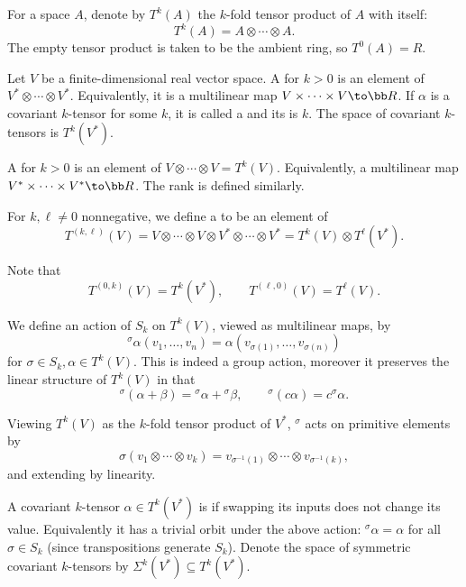 \bdefn

    For a space $A$, denote by $T^k(A)$ the $k$-fold tensor product of $A$ with itself:
    $$ T^k(A) = A\otimes\cdots\otimes A . $$
    The empty tensor product is taken to be the ambient ring, so $T^0(A)=R$.

\edefn

\bdefn

    Let $V$ be a finite-dimensional real vector space.
    A  for $k>0$ is an element of $V^*\otimes\cdots\otimes V^*$.
    Equivalently, it is a multilinear map $V\times\cdots\times V\to\bR$.
    If $\alpha$ is a covariant $k$-tensor for some $k$, it is called a  and its  is $k$.
    The space of covariant $k$-tensors is $T^k(V^*)$.

    A  for $k>0$ is an element of $V\otimes\cdots\otimes V=T^k(V)$.
    Equivalently, a multilinear map $V^*\times\cdots\times V^*\to\bR$.
    The rank is defined similarly.

    For $k,\ell\neq0$ nonnegative, we define a  to be an element of
    $$ T^{(k,\ell)}(V) = V\otimes\cdots\otimes V\otimes V^*\otimes\cdots\otimes V^* = T^k(V) \otimes T^\ell(V^*) . $$

\edefn

Note that
$$ T^{(0,k)}(V) = T^k(V^*),\qquad T^{(\ell,0)}(V) = T^\ell(V) . $$

\bdefn

    We define an action of $S_k$ on $T^k(V)$, viewed as multilinear maps, by
    $$ {}^\sigma\alpha(v_1,\dots,v_n) = \alpha(v_{\sigma(1)},\dots,v_{\sigma(n)}) $$
    for $\sigma\in S_k,\alpha\in T^k(V)$.
    This is indeed a group action, moreover it preserves the linear structure of $T^k(V)$ in that
    $$ {}^\sigma(\alpha+\beta) = {}^\sigma\alpha + {}^\sigma\beta,\qquad {}^\sigma(c\alpha) = c{}^\sigma\alpha . $$

\edefn

Viewing $T^k(V)$ as the $k$-fold tensor product of $V^*$, ${}^\sigma$ acts on primitive elements by
$$ \sigma(v_1\otimes\cdots\otimes v_k) = v_{\sigma^{-1}(1)}\otimes\cdots\otimes v_{\sigma^{-1}(k)} , $$
and extending by linearity.

\bdefn

    A covariant $k$-tensor $\alpha\in T^k(V^*)$ is  if swapping its inputs does not change its value.
    Equivalently it has a trivial orbit under the above action: ${}^\sigma\alpha=\alpha$ for all $\sigma\in S_k$ (since transpositions
    generate $S_k$).
    Denote the space of symmetric covariant $k$-tensors by $\Sigma^k(V^*)\subseteq T^k(V^*)$.

